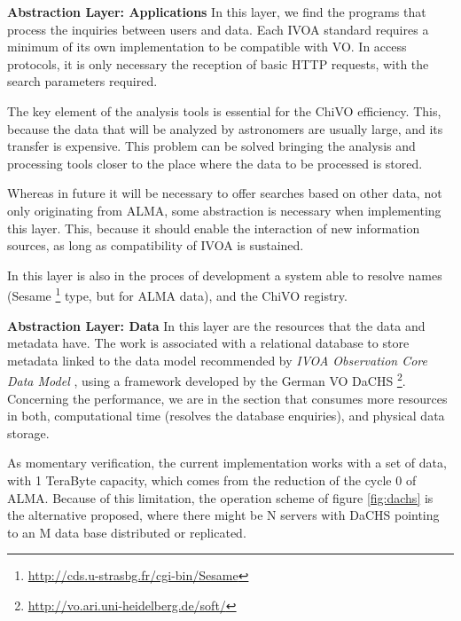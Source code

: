 \documentclass[]{spie}
\begin{document}
\textbf{Abstraction Layer:  Applications}
In this layer, we find the programs that process the inquiries between users and data.  Each IVOA standard requires a minimum of its own implementation to be compatible with VO.  In access protocols, it is only necessary the reception of basic HTTP requests, with the search parameters required.

The key element of the analysis tools is essential for the ChiVO efficiency.  This, because the data that will be analyzed by astronomers are usually large, and its transfer is expensive.  This problem can be solved bringing the analysis and processing tools closer to the place where the data to be processed is stored.

Whereas in future it will be necessary to offer searches based on other data, not only originating from ALMA, some abstraction is necessary when implementing this layer.  This, because it should enable the interaction of new information sources, as long as compatibility of IVOA is sustained.

In this layer is also in the proces of development a system able to resolve names (Sesame \footnote{\url{http://cds.u-strasbg.fr/cgi-bin/Sesame}} type, but for ALMA data), and the ChiVO registry.


\textbf{Abstraction Layer: Data}
In this layer are the resources that the data and metadata have.  The work is associated with a relational database to store metadata linked to the data model recommended by \emph{IVOA Observation Core Data Model} \cite{louys2011ivoa}, using a framework developed by the German VO DaCHS \footnote{\url{http://vo.ari.uni-heidelberg.de/soft/}}.  Concerning the performance, we are in the section that consumes more resources in both, computational time (resolves the database enquiries), and physical data storage.  

As momentary verification, the current implementation works with a set of data, with 1 TeraByte capacity, which comes from the reduction of the cycle 0 of ALMA.  Because of this limitation, the operation scheme of figure \ref{fig:dachs} is the alternative proposed, where there might be N servers with DaCHS pointing to an M data base distributed or replicated.
\end{document}
